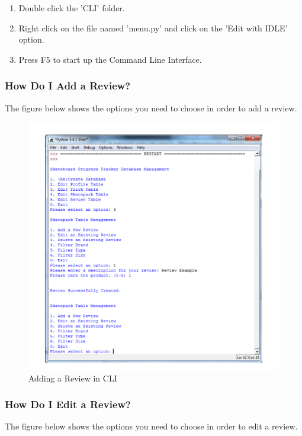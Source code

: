 \begin{enumerate}
\item Double click the 'CLI' folder.
\item Right click on the file named 'menu.py' and click on the 'Edit with IDLE' option.
\item Press F5 to start up the Command Line Interface.
\end{enumerate}

\subsubsection{How Do I Add a Review?}

The figure below shows the options you need to choose in order to add a review. 

\begin{figure}[H]
    \includegraphics[width=\textwidth]{./Manual/Images/AddReview.pdf}
    \caption{Adding a Review in CLI} \label{fig:Add Review}
\end{figure}



\subsubsection{How Do I Edit a Review?}

The figure below shows the options you need to choose in order to edit a review.

